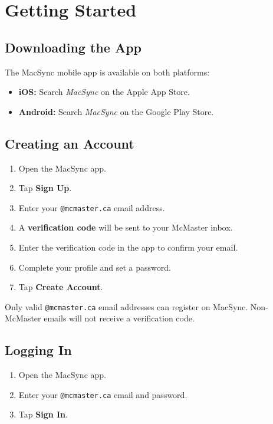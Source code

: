 \documentclass[12pt, twoside]{report}
\newcommand{\uielem}[1]{\textbf{#1}}
\begin{document}
\chapter{Getting Started}
\label{chap:started}

\section{Downloading the App}

The MacSync mobile app is available on both platforms:
\begin{itemize}
  \item \textbf{iOS:} Search \textit{MacSync} on the Apple App Store.
  \item \textbf{Android:} Search \textit{MacSync} on the Google Play Store.
\end{itemize}

\section{Creating an Account}

\begin{enumerate}
  \item Open the MacSync app.
  \item Tap \uielem{Sign Up}.
  \item Enter your \texttt{@mcmaster.ca} email address.
  \item A \textbf{verification code} will be sent to your McMaster inbox.
  \item Enter the verification code in the app to confirm your email.
  \item Complete your profile and set a password.
  \item Tap \uielem{Create Account}.
\end{enumerate}

\begin{notebox}
Only valid \texttt{@mcmaster.ca} email addresses can register on MacSync.
Non-McMaster emails will not receive a verification code.
\end{notebox}

\section{Logging In}

\begin{enumerate}
  \item Open the MacSync app.
  \item Enter your \texttt{@mcmaster.ca} email and password.
  \item Tap \uielem{Sign In}.
\end{enumerate}
\end{document}
